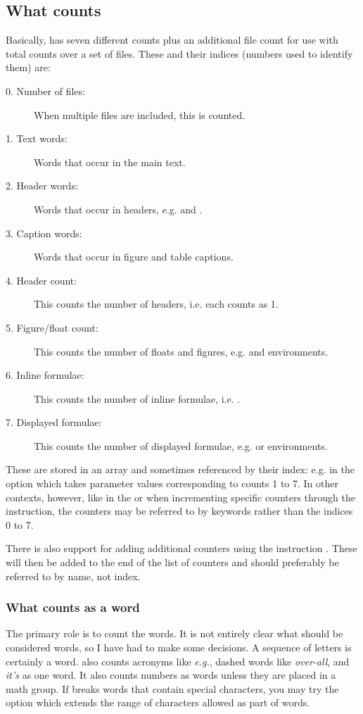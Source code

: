 \documentclass{article}
\begin{document}
\subsection{What \TeXcount{} counts}

Basically, \TeXcount{} has seven different counts plus an additional file count for use with total counts over a set of files. These and their indices (numbers used to identify them) are:
\begin{description}
\item[0. Number of files:] When multiple files are included, this is counted.
\item[1. Text words:] Words that occur in the main text.
\item[2. Header words:] Words that occur in headers, e.g.  and .
\item[3. Caption words:] Words that occur in figure and table captions.
\item[4. Header count:] This counts the number of headers, i.e. each  counts as 1.
\item[5. Figure/float count:] This counts the number of floats and figures, e.g.  and  environments.
\item[6. Inline formulae:] This counts the number of inline formulae, i.e. \code{\$\ldots\$}.
\item[7. Displayed formulae:] This counts the number of displayed formulae, e.g. \code{\bs{[}\ldots\bs{]}} or  environments.
\end{description}
These are stored in an array and sometimes referenced by their index: e.g. in the option  which takes parameter values corresponding to counts 1 to 7. In other contexts, however, like in the  or when incrementing specific counters through the  instruction, the counters may be referred to by keywords rather than the indices 0 to 7.

There is also support for adding additional counters using the \TeXcount{} instruction . These will then be added to the end of the list of counters and should preferably be referred to by name, not index.

\subsubsection{What \TeXcount{} counts as a word}

The primary role is to count the words. It is not entirely clear what should be considered words, so I have had to make some decisions. A sequence of letters is certainly a word. \TeXcount{} also counts acronyms like \textit{e.g.}, dashed words like \textit{over-all}, and \textit{it's} as one word. It also counts numbers as words unless they are placed in a math group. If \TeXcount{} breaks words that contain special characters, you may try the option  which extends the range of characters allowed as part of words.
\end{document}
